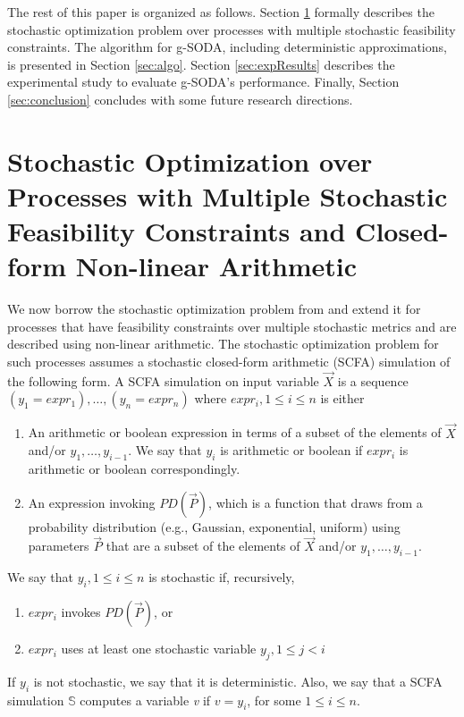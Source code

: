 \documentclass[a4paper, 12pt]{article} %
\begin{document}
The rest of this paper is organized as follows. Section \ref{sec:prob} formally describes the stochastic optimization problem over processes with multiple stochastic feasibility constraints. The algorithm for g-SODA, including deterministic approximations, is presented in Section \ref{sec:algo}. Section \ref{sec:expResults} describes the experimental study to evaluate g-SODA's performance. Finally, Section \ref{sec:conclusion} concludes with some future research directions. 


\section{Stochastic Optimization over Processes with Multiple Stochastic Feasibility Constraints and Closed-form Non-linear Arithmetic}
\label{sec:prob}

We now borrow the stochastic optimization problem from \cite{GMU-CS-TR-2017-3} and extend it for  processes that have feasibility constraints over multiple stochastic metrics and are described using non-linear arithmetic.
The stochastic optimization problem for such processes assumes a stochastic closed-form arithmetic (SCFA) simulation of the following form.
A SCFA simulation on input variable $\vec{X}$ is a sequence $(y_1=expr_1),\dots,(y_n=expr_n)$
\newline where $expr_i, 1\le i \le n$ is either
\begin{enumerate}[label=(\alph*)]
	\item An arithmetic or boolean expression in terms of a subset of the elements of $\vec{X}$ and/or $y_1,\dots,y_{i-1}$. We say that $y_i$ is arithmetic or boolean if $expr_i$ is arithmetic or boolean correspondingly.
	\item An expression invoking $PD(\vec{P})$, which is a function that draws from a probability distribution (e.g., Gaussian, exponential, uniform) using parameters $\vec{P}$ that are a subset of the elements of $\vec{X}$ and/or $y_1,\dots,y_{i-1}$.
\end{enumerate}
We say that $y_i, 1\le i \le n$ is stochastic if, recursively,
\begin{enumerate}[label=(\alph*)]
	\item $expr_i$ invokes $PD(\vec{P})$, or
	\item $expr_i$ uses at least one stochastic variable $y_j, 1\le j < i$
\end{enumerate}
If $y_i$ is not stochastic, we say that it is deterministic.
Also, we say that a SCFA simulation $\mathbb{S}$  computes a variable \textit{v} if $v=y_i$, for some $1\le i \le n$.
\end{document}
